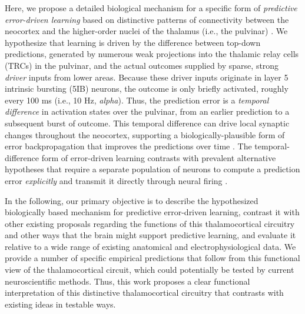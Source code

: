 \documentclass[11pt,twoside]{article}
\newif\myifpdf
\begin{document}
Here, we propose a detailed biological mechanism for a specific form of \emph{predictive error-driven learning} based on distinctive patterns of connectivity between the neocortex and the higher-order nuclei of the thalamus (i.e., the pulvinar) \citep{ShermanGuillery06,UsreySherman18}.  We hypothesize that learning is driven by the difference between top-down predictions, generated by numerous weak projections into the thalamic relay cells (TRCs) in the pulvinar, and the actual outcomes supplied by sparse, strong \emph{driver} inputs from lower areas.  Because these driver inputs originate in layer 5 intrinsic bursting (5IB) neurons, the outcome is only briefly activated, roughly every 100 ms (i.e., 10 Hz, \emph{alpha}).  Thus, the prediction error is a \emph{temporal difference} in activation states over the pulvinar, from an earlier prediction to a subsequent burst of outcome.  This temporal difference can drive local synaptic changes throughout the neocortex, supporting a biologically-plausible form of error backpropagation that improves the predictions over time \citep{OReilly96,AckleyHintonSejnowski85,HintonMcClelland88,BengioMesnardFischerEtAl17,WhittingtonBogacz19,LillicrapSantoroMarrisEtAl20}.
The temporal-difference form of error-driven learning contrasts with prevalent alternative hypotheses that require a separate population of neurons to compute a prediction error \emph{explicitly} and transmit it directly through neural firing \citep{RaoBallard99,KawatoHayakawaInui93,Friston05,Friston10,OudenKokLange12,LotterKreimanCox16}.

In the following, our primary objective is to describe the hypothesized biologically based mechanism for predictive error-driven learning, contrast it with other existing proposals regarding the functions of this thalamocortical circuitry and other ways that the brain might support predictive learning, and evaluate it relative to a wide range of existing anatomical and electrophysiological data.  We provide a number of specific empirical predictions that follow from this functional view of the thalamocortical circuit, which could potentially be tested by current neuroscientific methods.  Thus, this work proposes a clear functional interpretation of this distinctive thalamocortical circuitry that contrasts with existing ideas in testable ways.
\end{document}
